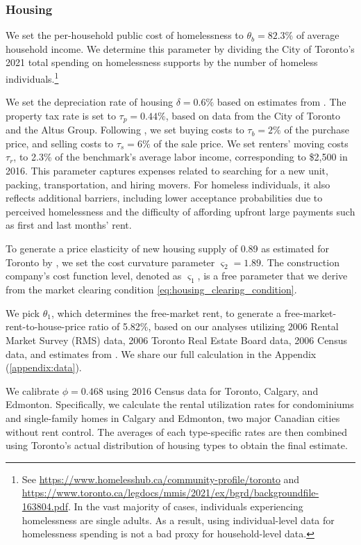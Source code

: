\documentclass[parskip=full]{article}
\begin{document}
\subsubsection{Housing}

We set the per-household public cost of homelessness to $\theta_{b}=82.3\%$ of average household income. We determine this parameter by dividing the City of Toronto's 2021 total spending on homelessness supports by the number of homeless individuals.\footnote{See \url{https://www.homelesshub.ca/community-profile/toronto} and \url{https://www.toronto.ca/legdocs/mmis/2021/ex/bgrd/backgroundfile-163804.pdf}. In the vast majority of cases, individuals experiencing homelessness are single adults. As a result, using individual-level data for homelessness spending is not a bad proxy for household-level data.}

We set the depreciation rate of housing $\delta=0.6\%$ based on estimates from \citet{rosenthal-2014}. The property tax rate is set to $\tau_p=0.44\%$, based on data from the City of Toronto and the Altus Group. Following \citet{gm-2003}, we set buying costs to $\tau_{b}=2\%$ of the purchase price, and selling costs to $\tau_{s}=6\% $ of the sale price. We set renters’ moving costs $\tau_r$, to 2.3\% of the benchmark's average labor income, corresponding to \$2,500 in 2016. This parameter captures expenses related to searching for a new unit, packing, transportation, and hiring movers. For homeless individuals, it also reflects additional barriers, including lower acceptance probabilities due to perceived homelessness and the difficulty of affording upfront large payments such as first and last months’ rent.

To generate a price elasticity of new housing supply of 0.89 as estimated for Toronto by \citet{piaxao-2021}, we set the cost curvature parameter $\varsigma_{2}=1.89$. The construction company's cost function level, denoted as $\varsigma_1$, is a free parameter that we derive from the market clearing condition \eqref{eq:housing_clearing_condition}.

We pick $\theta_1$, which determines the free-market rent, to generate a free-market-rent-to-house-price ratio of 5.82\%, based on our analyses utilizing 2006 Rental Market Survey (RMS) data, 2006 Toronto Real Estate Board data, 2006 Census data, and estimates from \citet{zhang-gou}. We share our full calculation in the Appendix (\ref{appendix:data}).

We calibrate $\phi=0.468$ using 2016 Census data for Toronto, Calgary, and Edmonton. Specifically, we calculate the rental utilization rates for condominiums and single-family homes in Calgary and Edmonton, two major Canadian cities without rent control. The averages of each type-specific rates are then combined using Toronto’s actual distribution of housing types to obtain the final estimate. 
\end{document}

